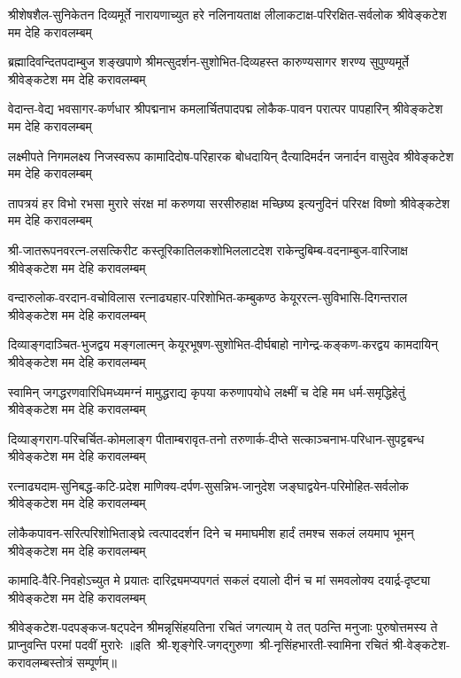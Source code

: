 \fourlineindentedshloka
{श्रीशेषशैल-सुनिकेतन दिव्यमूर्ते}
{नारायणाच्युत हरे नलिनायताक्ष}
{लीलाकटाक्ष-परिरक्षित-सर्वलोक}
{श्रीवेङ्कटेश मम देहि करावलम्बम्}

\fourlineindentedshloka
{ब्रह्मादिवन्दितपदाम्बुज शङ्खपाणे}
{श्रीमत्सुदर्शन-सुशोभित-दिव्यहस्त}
{कारुण्यसागर शरण्य सुपुण्यमूर्ते}
{श्रीवेङ्कटेश मम देहि करावलम्बम्}

\fourlineindentedshloka
{वेदान्त-वेद्य भवसागर-कर्णधार}
{श्रीपद्मनाभ कमलार्चितपादपद्म}
{लोकैक-पावन परात्पर पापहारिन्}
{श्रीवेङ्कटेश मम देहि करावलम्बम्}

\fourlineindentedshloka
{लक्ष्मीपते निगमलक्ष्य निजस्वरूप}
{कामादिदोष-परिहारक बोधदायिन्}
{दैत्यादिमर्दन जनार्दन वासुदेव}
{श्रीवेङ्कटेश मम देहि करावलम्बम्}

\fourlineindentedshloka
{तापत्रयं हर विभो रभसा मुरारे}
{संरक्ष मां करुणया सरसीरुहाक्ष}
{मच्छिष्य इत्यनुदिनं परिरक्ष विष्णो}
{श्रीवेङ्कटेश मम देहि करावलम्बम्}

\fourlineindentedshloka
{श्री-जातरूपनवरत्न-लसत्किरीट}
{कस्तूरिकातिलकशोभिललाटदेश}
{राकेन्दुबिम्ब-वदनाम्बुज-वारिजाक्ष}
{श्रीवेङ्कटेश मम देहि करावलम्बम्}

\fourlineindentedshloka
{वन्दारुलोक-वरदान-वचोविलास}
{रत्नाढ्यहार-परिशोभित-कम्बुकण्ठ}
{केयूररत्न-सुविभासि-दिगन्तराल}
{श्रीवेङ्कटेश मम देहि करावलम्बम्}

\fourlineindentedshloka
{दिव्याङ्गदाञ्चित-भुजद्वय मङ्गलात्मन्}
{केयूरभूषण-सुशोभित-दीर्घबाहो}
{नागेन्द्र-कङ्कण-करद्वय कामदायिन्}
{श्रीवेङ्कटेश मम देहि करावलम्बम्}

\fourlineindentedshloka
{स्वामिन् जगद्धरणवारिधिमध्यमग्नं}
{मामुद्धराद्य कृपया करुणापयोधे}
{लक्ष्मीं च देहि मम धर्म-समृद्धिहेतुं}
{श्रीवेङ्कटेश मम देहि करावलम्बम्}

\fourlineindentedshloka
{दिव्याङ्गराग-परिचर्चित-कोमलाङ्ग}
{पीताम्बरावृत-तनो तरुणार्क-दीप्ते}
{सत्काञ्चनाभ-परिधान-सुपट्टबन्ध}
{श्रीवेङ्कटेश मम देहि करावलम्बम्}

\fourlineindentedshloka
{रत्नाढ्यदाम-सुनिबद्ध-कटि-प्रदेश}
{माणिक्य-दर्पण-सुसन्निभ-जानुदेश}
{जङ्घाद्वयेन-परिमोहित-सर्वलोक}
{श्रीवेङ्कटेश मम देहि करावलम्बम्}

\fourlineindentedshloka
{लोकैकपावन-सरित्परिशोभिताङ्घ्रे}
{त्वत्पाददर्शन दिने च ममाघमीश}
{हार्दं तमश्च सकलं लयमाप भूमन्}
{श्रीवेङ्कटेश मम देहि करावलम्बम्}

\fourlineindentedshloka
{कामादि-वैरि-निवहोऽच्युत मे प्रयातः}
{दारिद्र्यमप्यपगतं सकलं दयालो}
{दीनं च मां समवलोक्य दयार्द्र-दृष्ट्या}
{श्रीवेङ्कटेश मम देहि करावलम्बम्}

\fourlineindentedshloka
{श्रीवेङ्कटेश-पदपङ्कज-षट्पदेन}
{श्रीमन्नृसिंहयतिना रचितं जगत्याम्}
{ये तत् पठन्ति मनुजाः पुरुषोत्तमस्य}
{ते प्राप्नुवन्ति परमां पदवीं मुरारेः}
॥इति~श्री-शृङ्गेरि-जगद्गुरुणा~श्री-नृसिंहभारती-स्वामिना रचितं श्री-वेङ्कटेश-करावलम्बस्तोत्रं सम्पूर्णम्॥